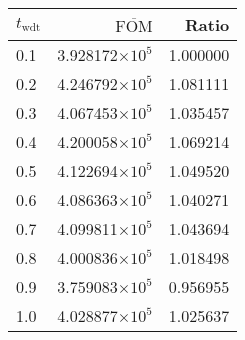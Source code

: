 \begin{tabular}{lrr}
\toprule
$t_{\mathrm{wdt}}$ & $\overline{\mathrm{FOM}}$ &    Ratio \\
\midrule
               0.1 &   3.928172$\times 10^{5}$ & 1.000000 \\
               0.2 &   4.246792$\times 10^{5}$ & 1.081111 \\
               0.3 &   4.067453$\times 10^{5}$ & 1.035457 \\
               0.4 &   4.200058$\times 10^{5}$ & 1.069214 \\
               0.5 &   4.122694$\times 10^{5}$ & 1.049520 \\
               0.6 &   4.086363$\times 10^{5}$ & 1.040271 \\
               0.7 &   4.099811$\times 10^{5}$ & 1.043694 \\
               0.8 &   4.000836$\times 10^{5}$ & 1.018498 \\
               0.9 &   3.759083$\times 10^{5}$ & 0.956955 \\
               1.0 &   4.028877$\times 10^{5}$ & 1.025637 \\
\bottomrule
\end{tabular}

